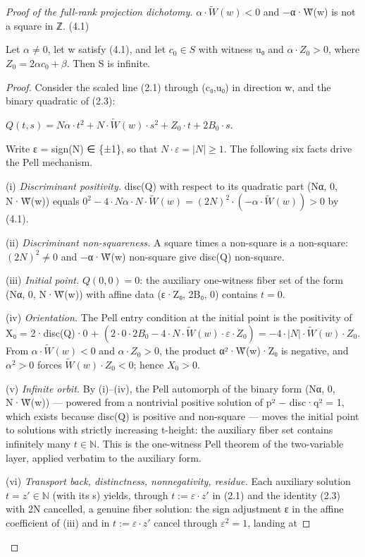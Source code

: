 \begin{proof}[Proof of the full-rank projection dichotomy]
$α·\tilde{W}(w) < 0$  and  −α·W̃(w) is not a square in ℤ.                  (4.1)

\begin{proposition*}
Let $α ≠ 0$, let w satisfy (4.1), and let $c_{0} ∈ S$ with witness u₀ and $α·Z_{0} > 0$, where $Z_{0} = 2αc_{0} + β$. Then S is infinite.

\end{proposition*}
\begin{proof}
Consider the scaled line (2.1) through (c₀,u₀) in direction w, and the binary quadratic of (2.3):

$Q(t,s) = Nα·t^{2} + N·\tilde{W}(w)·s^{2} + Z_{0}·t + 2B_{0}·s$.

Write ε = sign(N) ∈ \{±1\}, so that $N·ε = |N| ≥ 1$. The following six facts drive the Pell mechanism.

(i) \emph{Discriminant positivity.} disc(Q) with respect to its quadratic part (Nα, 0, N·W̃(w)) equals $0^{2} − 4·Nα·N·\tilde{W}(w) = (2N)^{2}·(−α·\tilde{W}(w)) > 0$ by (4.1).

(ii) \emph{Discriminant non-squareness.} A square times a non-square is a non-square: $(2N)^{2} ≠ 0$ and −α·W̃(w) non-square give disc(Q) non-square.

(iii) \emph{Initial point.} $Q(0,0) = 0$: the auxiliary one-witness fiber set of the form (Nα, 0, N·W̃(w)) with affine data (ε·Z₀, 2B₀, 0) contains $t = 0$.

(iv) \emph{Orientation.} The Pell entry condition at the initial point is the positivity of X₀ = 2·disc(Q)·0 + $(2·0·2B_{0} − 4·N·\tilde{W}(w)·ε·Z_{0}) = −4·|N|·\tilde{W}(w)·Z_{0}$. From $α·\tilde{W}(w) < 0$ and $α·Z_{0} > 0$, the product α²·W̃(w)·Z₀ is negative, and $α^{2} > 0$ forces $\tilde{W}(w)·Z_{0} < 0$; hence $X_{0} > 0$.

(v) \emph{Infinite orbit.} By (i)–(iv), the Pell automorph of the binary form (Nα, 0, N·W̃(w)) — powered from a nontrivial positive solution of p² − disc·q² = 1, which exists because disc(Q) is positive and non-square — moves the initial point to solutions with strictly increasing t-height: the auxiliary fiber set contains infinitely many $t ∈ ℕ$. This is the one-witness Pell theorem of the two-variable layer, applied verbatim to the auxiliary form.

(vi) \emph{Transport back, distinctness, nonnegativity, residue.} Each auxiliary solution $t = z′ ∈ ℕ$ (with its s) yields, through $t := ε·z′$ in (2.1) and the identity (2.3) with 2N cancelled, a genuine fiber solution: the sign adjustment ε in the affine coefficient of (iii) and in $t := ε·z′$ cancel through $ε^{2} = 1$, landing at


\end{proof}
\end{proof}
